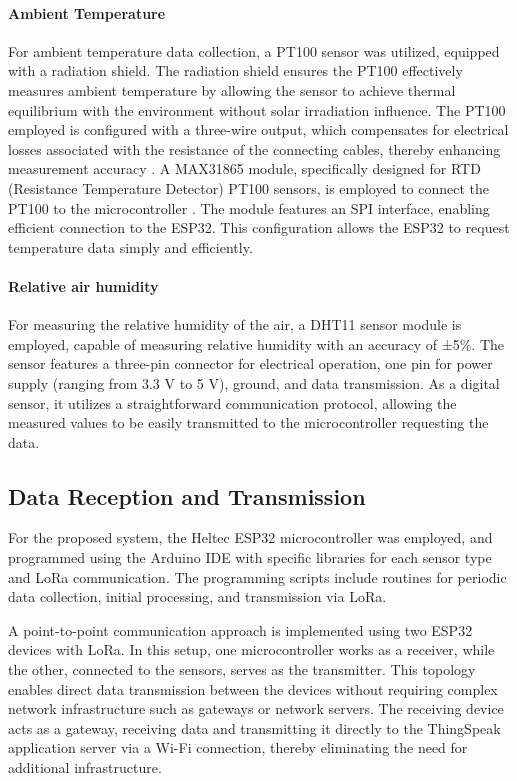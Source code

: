 \documentclass{ieeeaccess}
\begin{document}
\paragraph{Ambient Temperature}

For ambient temperature data collection, a PT100 sensor was utilized, equipped with a radiation shield. The radiation shield ensures the PT100 effectively measures ambient temperature by allowing the sensor to achieve thermal equilibrium with the environment without solar irradiation influence. The PT100 employed is configured with a three-wire output, which compensates for electrical losses associated with the resistance of the connecting cables, thereby enhancing measurement accuracy \cite{OmegaEngineering2015}. A MAX31865 module, specifically designed for RTD (Resistance Temperature Detector) PT100 sensors, is employed to connect the PT100 to the microcontroller \cite{MaximIntegrated2023}. The module features an SPI interface, enabling efficient connection to the ESP32. This configuration allows the ESP32 to request temperature data simply and efficiently.

\paragraph{Relative air humidity}

For measuring the relative humidity of the air, a DHT11 sensor module is employed, capable of measuring relative humidity with an accuracy of ±5\%. The sensor features a three-pin connector for electrical operation, one pin for power supply (ranging from 3.3 V to 5 V), ground, and data transmission. As a digital sensor, it utilizes a straightforward communication protocol, allowing the measured values to be easily transmitted to the microcontroller requesting the data.

\subsection{Data Reception and Transmission}

For the proposed system, the Heltec ESP32 microcontroller was employed, and programmed using the Arduino IDE with specific libraries for each sensor type and LoRa communication. The programming scripts include routines for periodic data collection, initial processing, and transmission via LoRa.

A point-to-point communication approach is implemented using two ESP32 devices with LoRa. In this setup, one microcontroller works as a receiver, while the other, connected to the sensors, serves as the transmitter. This topology enables direct data transmission between the devices without requiring complex network infrastructure such as gateways or network servers. The receiving device acts as a gateway, receiving data and transmitting it directly to the ThingSpeak application server via a Wi-Fi connection, thereby eliminating the need for additional infrastructure.
\end{document}
